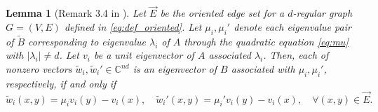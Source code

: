 \documentclass[11pt,reqno]{amsart}
\newtheorem{lemma}[theorem]{Lemma}
\theoremstyle{definition}
\begin{document}
\begin{lemma}[Remark 3.4 in \cite{lubetzky2016cutoff}] \label{lem:directededge}
{Let}  $\vec{E}$ be the oriented edge set for a $d$-regular graph $G=(V,E)$ defined in \eqref{eq:def_oriented}. Let $\mu_i, \mu_i'$ denote each eigenvalue pair of $\tilde B$ corresponding to eigenvalue $\lambda_i$ of $A$ through the quadratic equation \eqref{eq:mu} with $|\lambda_i|\not=d$. Let $v_i$ be a unit eigenvector of $A$ associated $\lambda_i$. 
Then, each of nonzero vectors $\tilde w_i, \tilde{w}_i' \in \mathbb C^{nd} $ is an eigenvector of $B$ associated with $\mu_i, \mu_i'$, respectively, {if and only if}  \begin{equation}\label{eq:eigenvectorB}
    \tilde w_i(x,y) = \mu_i v_i(y) - v_i(x), \quad \tilde w_i'(x,y) = \mu_i' v_i(y) - v_i(x), \quad\forall (x,y)\in \vec{E}.
\end{equation} 
\end{lemma}
\end{document}
